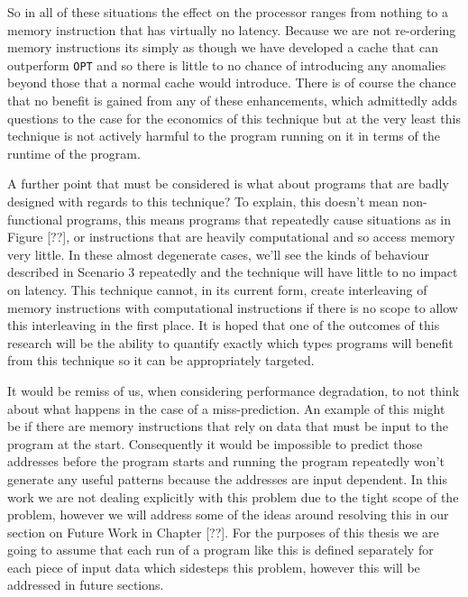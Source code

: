 So in all of these situations the effect on the processor ranges from nothing to a memory instruction that has virtually no latency. Because we are not re-ordering memory instructions its simply as though we have developed a cache that can outperform \texttt{OPT} and so there is little to no chance of introducing any anomalies beyond those that a normal cache would introduce. There is of course the chance that no benefit is gained from any of these enhancements, which admittedly adds questions to the case for the economics of this technique but at the very least this technique is not actively harmful to the program running on it in terms of the runtime of the program. 

A further point that must be considered is what about programs that are badly designed with regards to this technique? To explain, this doesn't mean non-functional programs, this means programs that repeatedly cause situations as in Figure [??], or instructions that are heavily computational and so access memory very little. In these almost degenerate cases, we'll see the kinds of behaviour described in Scenario 3 repeatedly and the technique will have little to no impact on latency. This technique cannot, in its current form, create interleaving of memory instructions with computational instructions if there is no scope to allow this interleaving in the first place. It is hoped that one of the outcomes of this research will be the ability to quantify exactly which types programs will benefit from this technique so it can be appropriately targeted. 

It would be remiss of us, when considering performance degradation, to not think about what happens in the case of a miss-prediction. An example of this might be if there are memory instructions that rely on data that must be input to the program at the start. Consequently it would be impossible to predict those addresses before the program starts and running the program repeatedly won't generate any useful patterns because the addresses are input dependent. In this work we are not dealing explicitly with this problem due to the tight scope of the problem, however we will address some of the ideas around resolving this in our section on Future Work in Chapter [??]. For the purposes of this thesis we are going to assume that each run of a program like this is defined separately for each piece of input data which sidesteps this problem, however this will be addressed in future sections.

